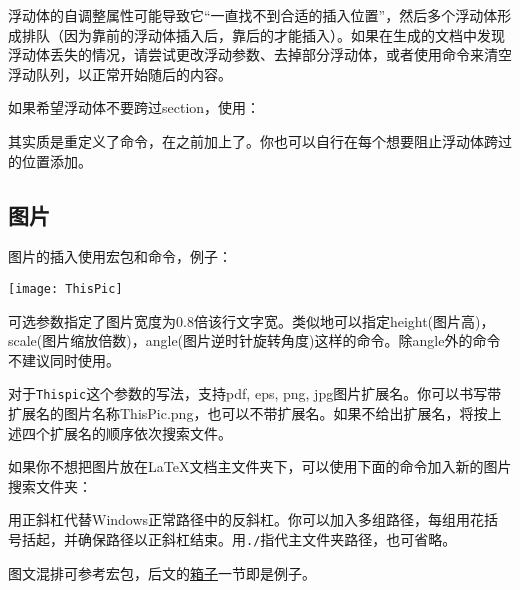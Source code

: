 浮动体的自调整属性可能导致它“一直找不到合适的插入位置”，然后多个浮动体形成排队（因为靠前的浮动体插入后，靠后的才能插入）。如果在生成的文档中发现浮动体丢失的情况，请尝试更改浮动参数、去掉部分浮动体，或者使用命令来清空浮动队列，以正常开始随后的内容。

如果希望浮动体不要跨过section，使用：
\begin{latex}
\usepackage[section]{placeins}
\end{latex}

其实质是重定义了命令，在之前加上了。你也可以自行在每个想要阻止浮动体跨过的位置添加。

\subsection{图片}
图片的插入使用宏包和命令，例子：
\begin{latex}
\begin{center}
    \texttt{[image: ThisPic]}
\end{center}
\end{latex}

可选参数指定了图片宽度为0.8倍该行文字宽。类似地可以指定height(图片高)，scale(图片缩放倍数)，angle(图片逆时针旋转角度)这样的命令。除angle外的命令不建议同时使用。

对于\texttt{Thispic}这个参数的写法，\xelatex 支持pdf, eps, png, jpg图片扩展名。你可以书写带扩展名的图片名称ThisPic.png，也可以不带扩展名。如果不给出扩展名，将按上述四个扩展名的顺序依次搜索文件。\dpar

如果你不想把图片放在\LaTeX 文档主文件夹下，可以使用下面的命令加入新的图片搜索文件夹：
\begin{latex}
\graphicspath{{c:/pics/}{./pic/}}
\end{latex}

用正斜杠代替Windows正常路径中的反斜杠。你可以加入多组路径，每组用花括号括起，并确保路径以正斜杠结束。用\verb|./|指代主文件夹路径，也可省略。\dpar

图文混排可参考宏包，后文的\hyperref[sec:box]{箱子}一节即是例子。
\begin{latex}
\end{latex}

